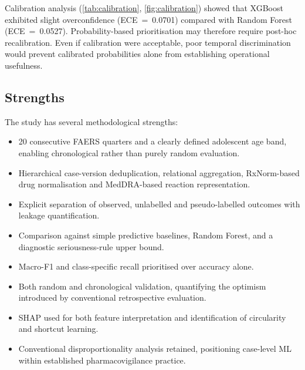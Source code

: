 \documentclass[10pt]{article}
\begin{document}
Calibration analysis (\cref{tab:calibration}, \cref{fig:calibration}) showed that XGBoost exhibited slight overconfidence (ECE~=~0.0701) compared with Random Forest (ECE~=~0.0527). Probability-based prioritisation may therefore require post-hoc recalibration. Even if calibration were acceptable, poor temporal discrimination would prevent calibrated probabilities alone from establishing operational usefulness.

\subsection{Strengths}
The study has several methodological strengths:
\begin{itemize}
\item 20 consecutive FAERS quarters and a clearly defined adolescent age band, enabling chronological rather than purely random evaluation.
\item Hierarchical case-version deduplication, relational aggregation, RxNorm-based drug normalisation and MedDRA-based reaction representation.
\item Explicit separation of observed, unlabelled and pseudo-labelled outcomes with leakage quantification.
\item Comparison against simple predictive baselines, Random Forest, and a diagnostic seriousness-rule upper bound.
\item Macro-F1 and class-specific recall prioritised over accuracy alone.
\item Both random and chronological validation, quantifying the optimism introduced by conventional retrospective evaluation.
\item SHAP used for both feature interpretation and identification of circularity and shortcut learning.
\item Conventional disproportionality analysis retained, positioning case-level ML within established pharmacovigilance practice.
\end{itemize}
\end{document}
